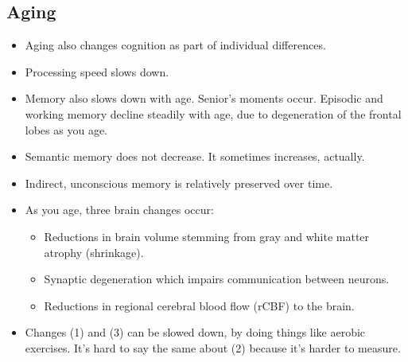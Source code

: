 \documentclass[]{article}
\begin{document}
		\subsection{Aging}
			\begin{itemize}
				\item Aging also changes cognition as part of individual differences.
				\item Processing speed slows down.
				\item Memory also slows down with age. Senior's moments occur. Episodic and working memory decline steadily with age, due to degeneration of the frontal lobes as you age.
				\item Semantic memory does not decrease. It sometimes increases, actually.
				\item Indirect, unconscious memory is relatively preserved over time.
				\item As you age, three brain changes occur:
					\begin{itemize}
						\item Reductions in brain volume stemming from gray and white matter atrophy (shrinkage).
						\item Synaptic degeneration which impairs communication between neurons.
						\item Reductions in regional cerebral blood flow (rCBF) to the brain.
					\end{itemize}
					
				\item Changes (1) and (3) can be slowed down, by doing things like aerobic exercises. It's hard to say the same about (2) because it's harder to measure.
			\end{itemize}
\end{document}
